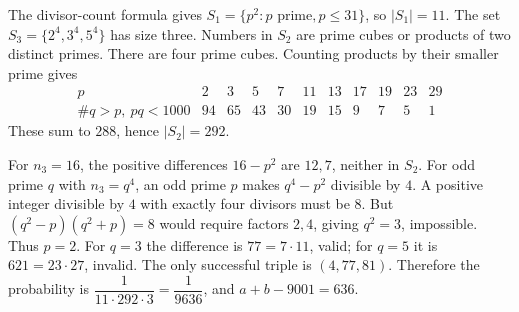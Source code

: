 The divisor-count formula gives $S_1=\{p^2:p\text{ prime},p\le31\}$, so $|S_1|=11$. The set $S_3=\{2^4,3^4,5^4\}$ has size three. Numbers in $S_2$ are prime cubes or products of two distinct primes. There are four prime cubes. Counting products by their smaller prime gives
\[
\begin{array}{c|rrrrrrrrrr}
p&2&3&5&7&11&13&17&19&23&29\\\hline
\#q>p,\ pq<1000&94&65&43&30&19&15&9&7&5&1
\end{array}
\]
These sum to $288$, hence $|S_2|=292$.

For $n_3=16$, the positive differences $16-p^2$ are $12,7$, neither in $S_2$. For odd prime $q$ with $n_3=q^4$, an odd prime $p$ makes $q^4-p^2$ divisible by $4$. A positive integer divisible by $4$ with exactly four divisors must be $8$. But $(q^2-p)(q^2+p)=8$ would require factors $2,4$, giving $q^2=3$, impossible. Thus $p=2$. For $q=3$ the difference is $77=7\cdot11$, valid; for $q=5$ it is $621=23\cdot27$, invalid.
The only successful triple is $(4,77,81)$. Therefore the probability is $\dfrac{1}{11\cdot292\cdot3}=\dfrac{1}{9636}$, and $\boxed{a+b-9001=636}$.

